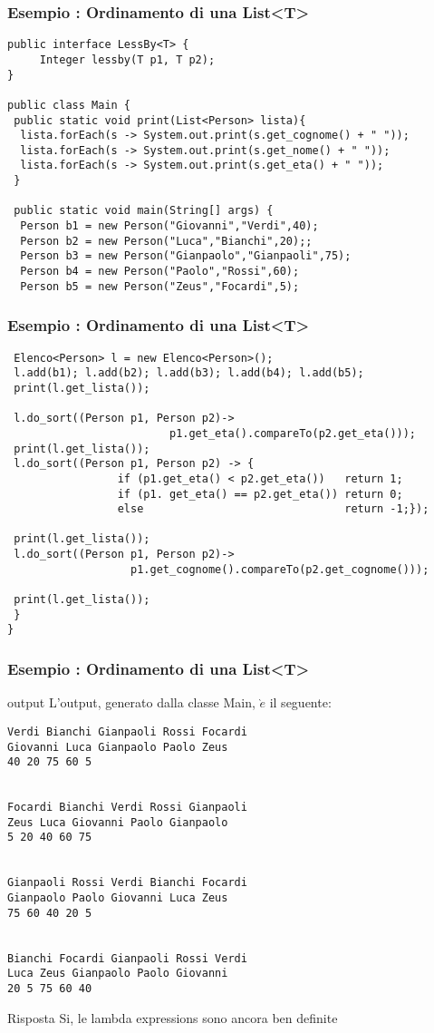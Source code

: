 \documentclass{beamer}
\begin{document}
\begin{frame}[fragile]
\frametitle{Esempio : Ordinamento di una List<T>}
\begin{lstlisting}
public interface LessBy<T> {
     Integer lessby(T p1, T p2);
}

public class Main {
 public static void print(List<Person> lista){
  lista.forEach(s -> System.out.print(s.get_cognome() + " "));
  lista.forEach(s -> System.out.print(s.get_nome() + " "));
  lista.forEach(s -> System.out.print(s.get_eta() + " "));
 }
 
 public static void main(String[] args) {
  Person b1 = new Person("Giovanni","Verdi",40);
  Person b2 = new Person("Luca","Bianchi",20);;
  Person b3 = new Person("Gianpaolo","Gianpaoli",75);
  Person b4 = new Person("Paolo","Rossi",60);
  Person b5 = new Person("Zeus","Focardi",5);
 \end{lstlisting}
\end{frame}

\begin{frame}[fragile]
\frametitle{Esempio : Ordinamento di una List<T>}
\begin{lstlisting}
 Elenco<Person> l = new Elenco<Person>();
 l.add(b1); l.add(b2); l.add(b3); l.add(b4); l.add(b5);
 print(l.get_lista());
 
 l.do_sort((Person p1, Person p2)->
                         p1.get_eta().compareTo(p2.get_eta()));
 print(l.get_lista());	
 l.do_sort((Person p1, Person p2) -> {
                 if (p1.get_eta() < p2.get_eta())   return 1;
               	 if (p1. get_eta() == p2.get_eta()) return 0;
                 else                               return -1;});
                 
 print(l.get_lista());
 l.do_sort((Person p1, Person p2)->
                   p1.get_cognome().compareTo(p2.get_cognome()));

 print(l.get_lista());
 }
}
\end{lstlisting}
\end{frame}

\begin{frame}[fragile]
\frametitle{Esempio : Ordinamento di una List<T>}
\begin{beamercolorbox}{output}
L'output, generato dalla classe Main, $\grave{e}$ il seguente:
\end{beamercolorbox}
\fontsize{11pt}{7.2}\selectfont
\begin{verbatim}
Verdi Bianchi Gianpaoli Rossi Focardi 
Giovanni Luca Gianpaolo Paolo Zeus 
40 20 75 60 5 


Focardi Bianchi Verdi Rossi Gianpaoli 
Zeus Luca Giovanni Paolo Gianpaolo 
5 20 40 60 75 


Gianpaoli Rossi Verdi Bianchi Focardi 
Gianpaolo Paolo Giovanni Luca Zeus 
75 60 40 20 5 


Bianchi Focardi Gianpaoli Rossi Verdi 
Luca Zeus Gianpaolo Paolo Giovanni 
20 5 75 60 40 
\end{verbatim}
\begin{block}{Risposta}
Si, le lambda expressions sono ancora ben definite
\end{block}
\end{frame}
\end{document}
